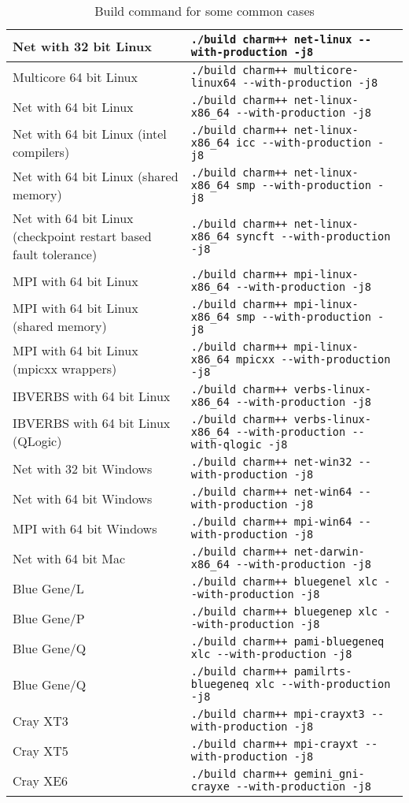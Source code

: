 \begin{table}[ht]
\begin{tabular}{|p{6cm}|p{9cm}|}
\hline
Net with 32 bit Linux & \verb|./build charm++ net-linux --with-production -j8|
\\\hline
Multicore 64 bit Linux & \verb|./build charm++ multicore-linux64 --with-production -j8|
\\\hline
Net with 64 bit Linux & \verb|./build charm++ net-linux-x86_64 --with-production -j8|
\\\hline
Net with 64 bit Linux (intel compilers) & \verb|./build charm++ net-linux-x86_64 icc --with-production -j8|
\\\hline
Net with 64 bit Linux (shared memory) & \verb|./build charm++ net-linux-x86_64 smp --with-production -j8|
\\\hline
Net with 64 bit Linux (checkpoint restart based fault tolerance) & \verb|./build charm++ net-linux-x86_64 syncft --with-production -j8|
\\\hline
MPI with 64 bit Linux & \verb|./build charm++ mpi-linux-x86_64 --with-production -j8|
\\\hline
MPI with 64 bit Linux (shared memory) & \verb|./build charm++ mpi-linux-x86_64 smp --with-production -j8|
\\\hline
MPI with 64 bit Linux (mpicxx wrappers) & \verb|./build charm++ mpi-linux-x86_64 mpicxx --with-production -j8|
\\\hline
IBVERBS with 64 bit Linux & \verb|./build charm++ verbs-linux-x86_64 --with-production -j8|
\\\hline
IBVERBS with 64 bit Linux (QLogic) & \verb|./build charm++ verbs-linux-x86_64 --with-production --with-qlogic -j8|
\\\hline
Net with 32 bit Windows & \verb|./build charm++ net-win32 --with-production -j8|
\\\hline
Net with 64 bit Windows & \verb|./build charm++ net-win64 --with-production -j8|
\\\hline
MPI with 64 bit Windows & \verb|./build charm++ mpi-win64 --with-production -j8|
\\\hline
Net with 64 bit Mac & \verb|./build charm++ net-darwin-x86_64 --with-production -j8|
\\\hline
Blue Gene/L & \verb|./build charm++ bluegenel xlc --with-production -j8|
\\\hline
Blue Gene/P & \verb|./build charm++ bluegenep xlc --with-production -j8|
\\\hline
Blue Gene/Q & \verb|./build charm++ pami-bluegeneq xlc --with-production -j8|
\\\hline
Blue Gene/Q & \verb|./build charm++ pamilrts-bluegeneq xlc --with-production -j8|
\\\hline
Cray XT3 & \verb|./build charm++ mpi-crayxt3 --with-production -j8|
\\\hline
Cray XT5 & \verb|./build charm++ mpi-crayxt --with-production -j8|
\\\hline
Cray XE6 & \verb|./build charm++ gemini_gni-crayxe --with-production -j8|
\\\hline
\end{tabular}
\caption{Build command for some common cases}
\label{tab:buildlist}
\end{table}

